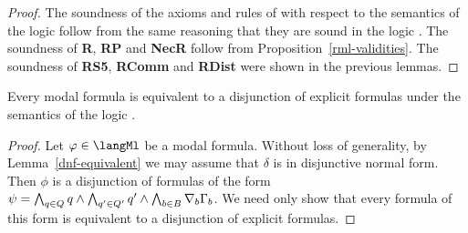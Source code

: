 \begin{proof}
The soundness of the axioms and rules of \axiomS{} with respect to the semantics of the logic \logicRmlS{} follow from the same reasoning that they are sound in the logic \logicS{}.
The soundness of {\bf R}, {\bf RP} and {\bf NecR} follow from Proposition~\ref{rml-validities}.
The soundness of {\bf RS5}, {\bf RComm} and {\bf RDist} were shown in the previous lemmas.
\end{proof}

\begin{lemma}
Every modal formula is equivalent to a disjunction of explicit formulas under the semantics of the logic \logicS{}.
\end{lemma}

\begin{proof}
Let $\phi \in \langMl$ be a modal formula.
Without loss of generality, by Lemma~\ref{dnf-equivalent} we may assume that $\delta$ is in disjunctive normal form.
Then $\phi$ is a disjunction of formulas of the form $\psi = \bigwedge_{q \in Q} q \land \bigwedge_{q' \in Q'} q' \land \bigwedge_{b \in B} \nabla_{b} \Gamma_b$.
We need only show that every formula of this form is equivalent to a disjunction of explicit formulas.


\end{proof}
